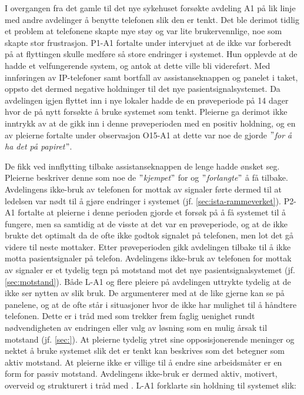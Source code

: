 \noindent
I overgangen fra det gamle til det nye sykehuset forsøkte avdeling A1 på lik linje med andre avdelinger å benytte telefonen slik den er tenkt. Det ble derimot tidlig et problem at telefonene skapte mye støy og var lite brukervennlige, noe som skapte stor frustrasjon. P1-A1 fortalte under intervjuet at de ikke var forberedt på at flyttingen skulle medføre så store endringer i systemet. Hun opplevde at de hadde et velfungerende system, og antok at dette ville bli videreført. Med innføringen av IP-telefoner samt bortfall av assistanseknappen og panelet i taket, oppsto det dermed negative holdninger til det nye pasientsignalsystemet. Da avdelingen igjen flyttet inn i nye lokaler hadde de en prøveperiode på 14 dager hvor de på nytt forsøkte å bruke systemet som tenkt. Pleierne ga derimot ikke inntrykk av at de gikk inn i denne prøveperioden med en positiv holdning, og en av pleierne fortalte under observasjon O15-A1 at dette var noe de gjorde \textit{$"$for å ha det på papiret$"$}. 

\noindent
De fikk ved innflytting tilbake assistanseknappen de lenge hadde ønsket seg. Pleierne beskriver denne som noe de \textit{$"$kjempet$"$} for og \textit{$"$forlangte$"$} å få tilbake. Avdelingens ikke-bruk av telefonen for mottak av signaler førte dermed til at ledelsen var nødt til å gjøre endringer i systemet (jf. \ref{sec:ista-rammeverket}). P2-A1 fortalte at pleierne i denne perioden gjorde et forsøk på å få systemet til å fungere, men sa samtidig at de visste at det var en prøveperiode, og at de ikke brukte det optimalt da de ofte ikke godtok signalet på telefonen, men lot det gå videre til neste mottaker. Etter prøveperioden gikk avdelingen tilbake til å ikke motta pasientsignaler på telefon. Avdelingens ikke-bruk av telefonen for mottak av signaler er et tydelig tegn på motstand mot det nye pasientsignalsystemet (jf. \ref{sec:motstand}). Både L-A1 og flere pleiere på avdelingen uttrykte tydelig at de ikke ser nytten av slik bruk. De argumenterer med at de like gjerne kan se på panelene, og at de ofte står i situasjoner hvor de ikke har mulighet til å håndtere telefonen. Dette er i tråd med \citet{Jacobsen12} som trekker frem faglig uenighet rundt nødvendigheten av endringen eller valg av løsning som en mulig årsak til motstand (jf. \ref{sec:}). At pleierne tydelig ytret sine opposisjonerende meninger og nektet å bruke systemet slik det er tenkt kan beskrives som det \citet{Lapointe05} betegner som aktiv motstand. At pleierne ikke er villige til å endre sine arbeidsmåter er en form for passiv motstand. Avdelingens ikke-bruk er dermed aktiv, motivert, overveid og strukturert i tråd med \citet{Satchell09}. L-A1 forklarte sin holdning til systemet slik: 

